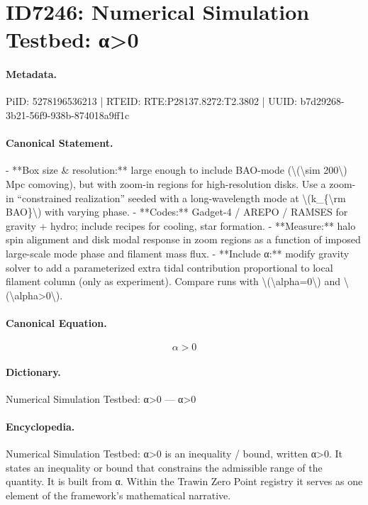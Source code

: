 \section*{ID7246: Numerical Simulation Testbed: α>0}
\paragraph{Metadata.}
PiID: 5278196536213 | RTEID: RTE:P28137.8272:T2.3802 | UUID: b7d29268-3b21-56f9-938b-874018a9ff1c

\paragraph{Canonical Statement.}
- **Box size \& resolution:** large enough to include BAO-mode (\textbackslash{}(\textbackslash{}sim 200\textbackslash{}) Mpc comoving), but with zoom-in regions for high-resolution disks. Use a zoom-in “constrained realization” seeded with a long-wavelength mode at \textbackslash{}(k\_\{\textbackslash{}rm BAO\}\textbackslash{}) with varying phase. - **Codes:** Gadget-4 / AREPO / RAMSES for gravity + hydro; include recipes for cooling, star formation. - **Measure:** halo spin alignment and disk modal response in zoom regions as a function of imposed large-scale mode phase and filament mass flux. - **Include α:** modify gravity solver to add a parameterized extra tidal contribution proportional to local filament column (only as experiment). Compare runs with \textbackslash{}(\textbackslash{}alpha=0\textbackslash{}) and \textbackslash{}(\textbackslash{}alpha>0\textbackslash{}).

\paragraph{Canonical Equation.}
\[
\alpha>0
\]

\paragraph{Dictionary.}
Numerical Simulation Testbed: α>0 — α>0

\paragraph{Encyclopedia.}
Numerical Simulation Testbed: α>0 is an inequality / bound, written α>0. It states an inequality or bound that constrains the admissible range of the quantity. It is built from α. Within the Trawin Zero Point registry it serves as one element of the framework's mathematical narrative.
